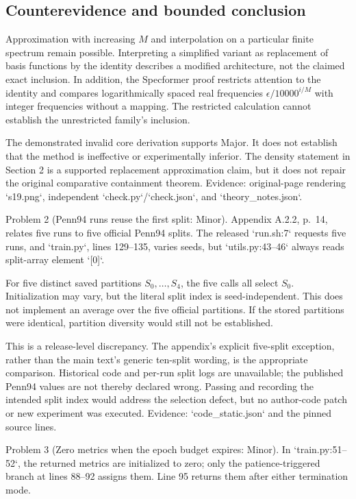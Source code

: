 \documentclass[10pt]{article}
\begin{document}
\subsection*{Counterevidence and bounded conclusion}
Approximation with increasing \(M\) and interpolation on a particular finite spectrum remain possible. Interpreting a simplified variant as replacement of basis functions by the identity describes a modified architecture, not the claimed exact inclusion. In addition, the Specformer proof restricts attention to the identity and compares logarithmically spaced real frequencies \(\epsilon/10000^{i/M}\) with integer frequencies without a mapping. The restricted calculation cannot establish the unrestricted family’s inclusion.\par
The demonstrated invalid core derivation supports Major. It does not establish that the method is ineffective or experimentally inferior. The density statement in Section 2 is a supported replacement approximation claim, but it does not repair the original comparative containment theorem. Evidence: original-page rendering `s19.png`, independent `check.py`/`check.json`, and `theory\_notes.json`.\par
Problem 2 (Penn94 runs reuse the first split: Minor).  Appendix A.2.2, p. 14, relates five runs to five official Penn94 splits. The released `run.sh:7` requests five runs, and `train.py`, lines 129–135, varies seeds, but `utils.py:43–46` always reads split-array element `[0]`.\par
For five distinct saved partitions \(S_0,\ldots,S_4\), the five calls all select \(S_0\). Initialization may vary, but the literal split index is seed-independent. This does not implement an average over the five official partitions. If the stored partitions were identical, partition diversity would still not be established.\par
This is a release-level discrepancy. The appendix’s explicit five-split exception, rather than the main text’s generic ten-split wording, is the appropriate comparison. Historical code and per-run split logs are unavailable; the published Penn94 values are not thereby declared wrong. Passing and recording the intended split index would address the selection defect, but no author-code patch or new experiment was executed. Evidence: `code\_static.json` and the pinned source lines.\par
Problem 3 (Zero metrics when the epoch budget expires: Minor).  In `train.py:51–52`, the returned metrics are initialized to zero; only the patience-triggered branch at lines 88–92 assigns them. Line 95 returns them after either termination mode.\par
\end{document}
